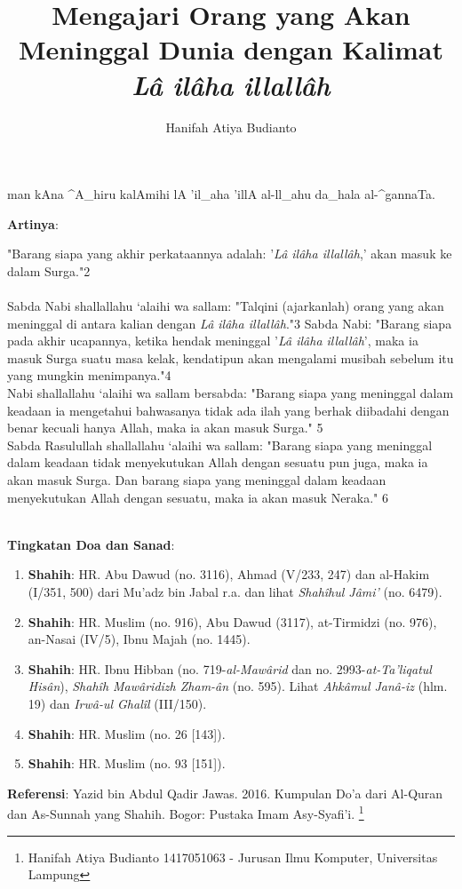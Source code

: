 \documentclass[a4paper,12pt]{article}
\title{\Large Mengajari Orang yang Akan Meninggal Dunia dengan Kalimat 
\textit{L\^{a} il\^{a}ha illall\^{a}h}}
\author{\calligra Hanifah Atiya Budianto}
\begin{document}
\sffamily
\maketitle 
\fullvocalize
{}
\begin{arabtext}
\noindent
man kAna ^A_hiru kalAmihi lA 'il_aha 'illA al-ll_ahu da_hala al-^gannaTa.\\
\end{arabtext}
\noindent
\textbf{Artinya}:
\par
\indent "Barang siapa yang akhir perkataannya adalah: '\textit{L\^{a} 
il\^{a}ha illall\^{a}h},' akan masuk ke dalam Surga."{\scriptsize 2}\\\\
\indent Sabda Nabi shallallahu ‘alaihi wa sallam: "Talqini (ajarkanlah) 
orang yang akan meninggal di antara kalian dengan \textit{L\^{a} il\^{a}ha 
illall\^{a}h}."{\scriptsize 3}  Sabda Nabi: "Barang siapa pada akhir 
ucapannya, ketika hendak meninggal '\textit{L\^{a} il\^{a}ha 
illall\^{a}h}', maka ia masuk Surga suatu masa kelak, kendatipun akan 
mengalami musibah sebelum itu yang mungkin menimpanya."{\scriptsize 4}\\
\indent Nabi shallallahu ‘alaihi wa sallam bersabda: "Barang siapa yang 
meninggal dalam keadaan ia mengetahui bahwasanya tidak ada ilah yang berhak 
diibadahi dengan benar kecuali hanya Allah, maka ia akan masuk Surga."
{\scriptsize 5}\\
\indent Sabda Rasulullah shallallahu ‘alaihi wa sallam: "Barang siapa yang 
meninggal dalam keadaan tidak menyekutukan Allah dengan sesuatu pun juga, 
maka ia akan masuk Surga. Dan barang siapa yang meninggal dalam keadaan 
menyekutukan Allah dengan sesuatu, maka ia akan masuk Neraka."
{\scriptsize 6}\\\\
\par
\noindent
\textbf{Tingkatan Doa dan Sanad}:
\begin{enumerate}
\item \textbf{Shahih}: HR. Abu Dawud (no. 3116), Ahmad (V/233, 247) dan 
al-Hakim (I/351, 500) dari Mu'adz bin Jabal r.a. dan lihat 
\textit{Shah\^{i}hul J\^{a}mi'} (no. 6479).
\item \textbf{Shahih}: HR. Muslim (no. 916), Abu Dawud (3117), at-Tirmidzi 
(no. 976), an-Nasai (IV/5), Ibnu Majah (no. 1445).
\item \textbf{Shahih}: HR. Ibnu Hibban (no. 719-\textit{al-Maw\^{a}rid} dan
no. 2993-\textit{at-Ta'liqatul His\^{a}n}), \textit{Shah\^{i}h 
Maw\^{a}ridizh Zham-\^{a}n} (no. 595). Lihat \textit{Ahk\^{a}mul 
Jan\^{a}-iz} (hlm. 19) dan \textit{Irw\^{a}-ul Ghal\^{i}l} (III/150).
\item \textbf{Shahih}: HR. Muslim (no. 26 [143]).
\item \textbf{Shahih}: HR. Muslim (no. 93 [151]).
\end{enumerate}
\textbf{Referensi}: Yazid bin Abdul Qadir Jawas. 2016. Kumpulan Do'a dari
Al-Quran dan As-Sunnah yang Shahih. Bogor: Pustaka Imam Asy-Syafi'i.
\footnote{Hanifah Atiya Budianto 1417051063 - Jurusan Ilmu Komputer,
Universitas Lampung}
\end{document}
